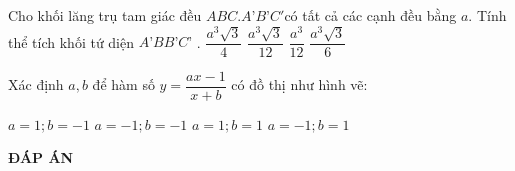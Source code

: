 \begin{ex}%
Cho khối lăng trụ tam giác đều $ABC.A’B’C'$có tất cả các cạnh đều bằng $a$. Tính thể tích
khối tứ diện $A’BB’C’$ .
\choice
{$\dfrac{a^3\sqrt{3}}{4}$ }
{\True $\dfrac{a^3\sqrt{3}}{12}$ }
{ $\dfrac{a^3}{12}$ }
{$\dfrac{a^3\sqrt{3}}{6}$ }
\end{ex}
\begin{ex}%
Xác định $a, b$ để hàm số $y=\dfrac{ax-1}{x+b}$ có đồ thị như hình vẽ:
\begin{center}
\end{center}
\choice
{$a=1; b=-1$ }
{$a=-1; b=-1$ }
{ \True $a=1; b=1$ }
{$a=-1; b=1$ }
\end{ex}
\newpage
\begin{center}
	\textbf{ĐÁP ÁN}
\end{center}
\begin{multicols}{10}
 
\end{multicols}

